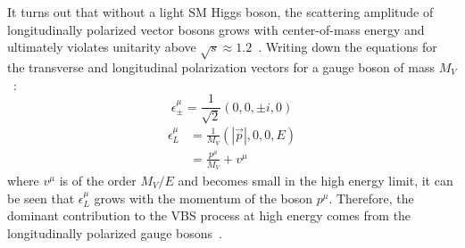 It turns out that without a light SM Higgs boson, the scattering amplitude of longitudinally polarized vector bosons grows with center-of-mass energy and ultimately violates unitarity above $\sqrt{s}\approx 1.2$~\cite{1977.ben-lee-weak-interactions, 2009.strong-gauge-boson-scattering}.
Writing down the equations for the transverse and longitudinal polarization vectors for a gauge boson of mass $M_V$~\cite{1990.strong-ww-scattering}:
\begin{equation}
  \epsilon^{\mu}_{\pm} = \frac{1}{\sqrt{2}}(0,0,\pm i, 0)
\end{equation}
\begin{equation}
  \begin{aligned}
    \epsilon^{\mu}_L &= \frac{1}{M_V}(|\vec{p}|, 0, 0, E)\\
                    &= \frac{p^{\mu}}{M_V}+v^{\mu}
  \end{aligned}
  \label{eq:longitudinal_polarization}
\end{equation}
where $v^{\mu}$ is of the order $M_V/E$ and becomes small in the high energy limit, it can be seen that $\epsilon^{\mu}_{L}$ grows with the momentum of the boson $p^{\mu}$.
Therefore, the dominant contribution to the VBS process at high energy comes from the longitudinally polarized gauge bosons~\cite{2012.vbs-thesis-oord}.


